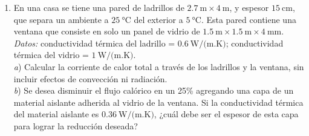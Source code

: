 \documentclass[a4paper,11pt,dvipsnames]{article}
\begin{document}
\begin{enumerate}[leftmargin=*]
  \item En una casa se tiene una pared de ladrillos de $\SI{2.7}{\metre}\times \SI{4}{\metre}$, y espesor $\SI{15}{\centi\metre}$, que separa un ambiente a $\SI{25}{\celsius}$ del exterior a $\SI{5}{\celsius}$. Esta pared contiene una ventana que consiste en solo un panel de vidrio de $\SI{1.5}{\metre}\times \SI{1.5}{\metre} \times \SI{4}{\milli\metre}$.\\
  \textit{Datos:} conductividad térmica del ladrillo = $\SI{0.6}{\watt/(\metre . \kelvin)}$; conductividad térmica del vidrio = $\SI{1}{\watt/(\metre . \kelvin)}$.\\
  \textit{a}) Calcular la corriente de calor total a través de los ladrillos y la ventana, sin incluir efectos de convección ni radiación.\\
  \textit{b}) Se desea disminuir el flujo calórico en un 25\% agregando una capa de un material aislante adherida al vidrio de la ventana. Si la conductividad térmica del material aislante es $\SI{0.36}{\watt/(\metre . \kelvin)}$, ¿cuál debe ser el espesor de esta capa para lograr la reducción deseada?


\end{enumerate}
\end{document}
